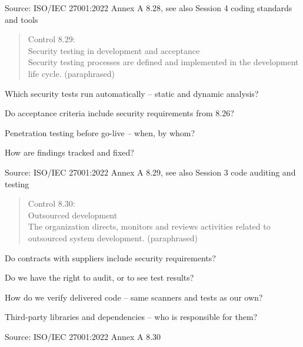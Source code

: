 \documentclass[Screen16to9,17pt]{foils}
\begin{document}
Source: ISO/IEC 27001:2022 Annex A 8.28, see also Session 4 coding standards and tools


\begin{quote}
Control 8.29:\\
Security testing in development and acceptance\\
Security testing processes are defined and implemented in the development life cycle. (paraphrased)
\end{quote}

\begin{list1}
\item Which security tests run automatically -- static and dynamic analysis?
\item Do acceptance criteria include security requirements from 8.26?
\item Penetration testing before go-live -- when, by whom?
\item How are findings tracked and fixed?
\end{list1}

Source: ISO/IEC 27001:2022 Annex A 8.29, see also Session 3 code auditing and testing


\begin{quote}
Control 8.30:\\
Outsourced development\\
The organization directs, monitors and reviews activities related to outsourced system development. (paraphrased)
\end{quote}

\begin{list1}
\item Do contracts with suppliers include security requirements?
\item Do we have the right to audit, or to see test results?
\item How do we verify delivered code -- same scanners and tests as our own?
\item Third-party libraries and dependencies -- who is responsible for them?
\end{list1}

Source: ISO/IEC 27001:2022 Annex A 8.30

\end{document}

